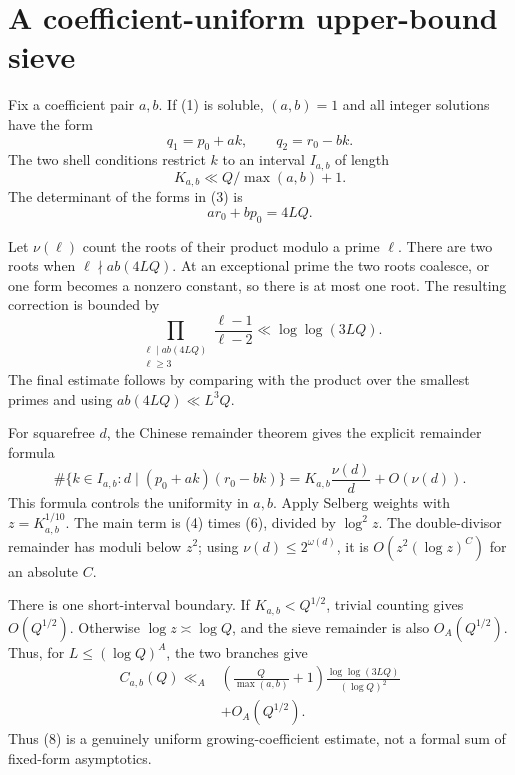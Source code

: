 \section{A coefficient-uniform upper-bound sieve}

Fix a coefficient pair \(a,b\).  If (1) is soluble, \((a,b)=1\) and all
integer solutions have the form
\[
 q_1=p_0+ak,\qquad q_2=r_0-bk. \tag{3}
\]
The two shell conditions restrict \(k\) to an interval \(I_{a,b}\) of length
\[
 K_{a,b}\ll Q/\max(a,b)+1. \tag{4}
\]
The determinant of the forms in (3) is
\[
 ar_0+bp_0=4LQ. \tag{5}
\]

Let \(\nu(\ell)\) count the roots of their product modulo a prime \(\ell\).
There are two roots when \(\ell\nmid ab(4LQ)\).  At an exceptional prime the
two roots coalesce, or one form becomes a nonzero constant, so there is at
most one root.  The resulting correction is bounded by
\[
 \prod_{\substack{\ell\mid ab(4LQ)\\\ell\ge3}}
 \frac{\ell-1}{\ell-2}
 \ll \log\log(3LQ). \tag{6}
\]
The final estimate follows by comparing with the product over the smallest
primes and using \(ab(4LQ)\ll L^3Q\).

For squarefree \(d\), the Chinese remainder theorem gives the explicit
remainder formula
\[
 \#\{k\in I_{a,b}:d\mid(p_0+ak)(r_0-bk)\}
 =K_{a,b}\frac{\nu(d)}d+O(\nu(d)). \tag{7}
\]
This formula controls the uniformity in \(a,b\).  Apply Selberg weights with
\(z=K_{a,b}^{1/10}\).  The main term is (4) times (6), divided by
\(\log^2z\).  The double-divisor remainder has moduli below \(z^2\); using
\(\nu(d)\le2^{\omega(d)}\), it is
\(O(z^2(\log z)^C)\) for an absolute \(C\).

There is one short-interval boundary.  If \(K_{a,b}<Q^{1/2}\), trivial
counting gives \(O(Q^{1/2})\).  Otherwise \(\log z\asymp\log Q\), and the
sieve remainder is also \(O_A(Q^{1/2})\).  Thus, for
\(L\le(\log Q)^A\), the two branches give
\[
\begin{split}
 C_{a,b}(Q)\ll_A&
 \left(\frac{Q}{\max(a,b)}+1\right)
 \frac{\log\log(3LQ)}{(\log Q)^2}\\
 &+O_A\!\left(Q^{1/2}\right).
\end{split}
\tag{8}
\]
Thus (8) is a genuinely uniform growing-coefficient estimate, not a formal
sum of fixed-form asymptotics.
